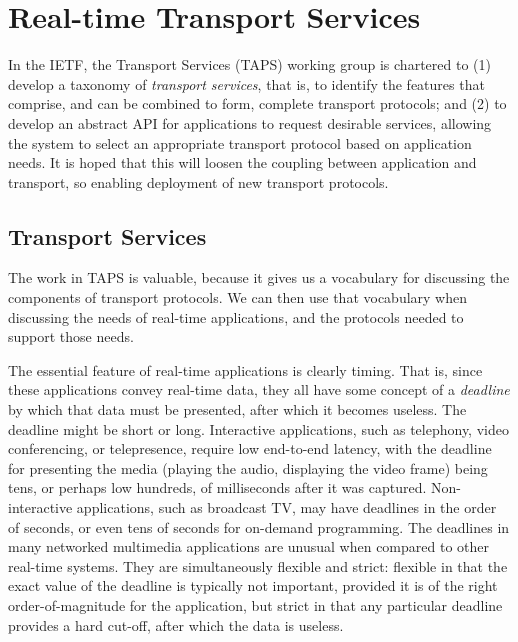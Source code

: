 \documentclass{sig-alternate-05-2015}
\begin{document}
\section{Real-time Transport Services}
\label{sec:services}

In the IETF, the Transport Services (TAPS) working group is chartered to 
(1) develop a taxonomy of \emph{transport services}, that is, to identify the
features that comprise, and can be combined to form, complete transport
protocols; and (2) to develop an abstract API for applications to request
desirable services, allowing the system to select an appropriate transport
protocol based on application needs. It is hoped that this will loosen the
coupling between application and transport, so enabling deployment of new 
transport protocols.

\subsection{Transport Services}

The work in TAPS is valuable, because it gives us a vocabulary for
discussing the components of transport protocols.  We can then use that
vocabulary when discussing the needs of real-time applications, and the
protocols needed to support those needs.

The essential feature of real-time applications is clearly timing. That is,
since these applications convey real-time data, they all have some concept
of a \emph{deadline} by which that data must be presented, after which it
becomes useless. 
The deadline might be short or long. Interactive applications, such as
telephony, video conferencing, or telepresence, require low end-to-end
latency, with the deadline for presenting the media (playing the audio,
displaying the video frame) being tens, or perhaps low hundreds, of
milliseconds after it was captured. Non-interactive applications, such as
broadcast TV, may have deadlines in the order of seconds, or even tens of
seconds for on-demand programming. 
The deadlines in many networked multimedia applications are unusual when
compared to other real-time systems. They are simultaneously flexible and
strict: flexible in that the exact value of the deadline is typically not
important, provided it is of the right order-of-magnitude for the
application, but strict in that any particular deadline provides a hard
cut-off, after which the data is useless. 
\end{document}
